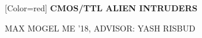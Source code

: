 \documentclass{article}
\begin{document}
{

	[Color=red]
	\fontsize{0.7in}{0.6in}\selectfont 
	\bfseries
	CMOS/TTL ALIEN INTRUDERS
}

\vspace{0.25in}

{
	\fontsize{0.55in}{0.6in}\selectfont
	MAX MOGEL {\fontsize{0.4in}{0.6in}\selectfont ME '18, ADVISOR: YASH RISBUD}
}
\end{document}
